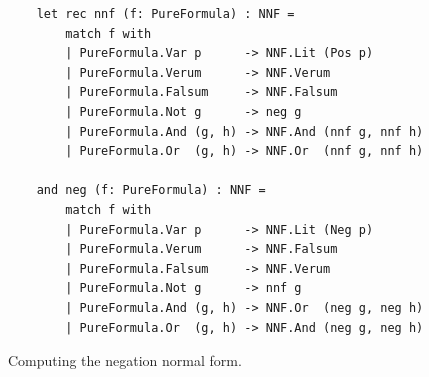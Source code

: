 \begin{figure}[!ht]
  \centering
\begin{verbatim}
    let rec nnf (f: PureFormula) : NNF =
        match f with
        | PureFormula.Var p      -> NNF.Lit (Pos p)
        | PureFormula.Verum      -> NNF.Verum
        | PureFormula.Falsum     -> NNF.Falsum
        | PureFormula.Not g      -> neg g
        | PureFormula.And (g, h) -> NNF.And (nnf g, nnf h)
        | PureFormula.Or  (g, h) -> NNF.Or  (nnf g, nnf h)

    and neg (f: PureFormula) : NNF =
        match f with
        | PureFormula.Var p      -> NNF.Lit (Neg p)
        | PureFormula.Verum      -> NNF.Falsum
        | PureFormula.Falsum     -> NNF.Verum
        | PureFormula.Not g      -> nnf g
        | PureFormula.And (g, h) -> NNF.Or  (neg g, neg h)
        | PureFormula.Or  (g, h) -> NNF.And (neg g, neg h)
\end{verbatim}
\vspace*{-0.3cm}
  \caption{Computing the negation normal form.}
  \label{fig:nnf}
\end{figure}

